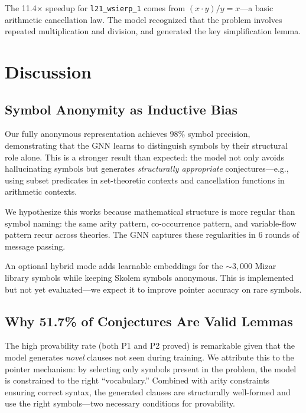 \documentclass{article}
\begin{document}
The 11.4$\times$ speedup for \texttt{l21\_wsierp\_1} comes from
$(x \cdot y) / y = x$---a basic arithmetic cancellation law. The model
recognized that the problem involves repeated multiplication and division,
and generated the key simplification lemma.

\section{Discussion}
\label{sec:discussion}

\subsection{Symbol Anonymity as Inductive Bias}

Our fully anonymous representation achieves 98\% symbol precision, demonstrating
that the GNN learns to distinguish symbols by their structural role alone. This
is a stronger result than expected: the model not only avoids hallucinating
symbols but generates \emph{structurally appropriate} conjectures---e.g., using
subset predicates in set-theoretic contexts and cancellation functions in
arithmetic contexts.

We hypothesize this works because mathematical structure is more regular than
symbol naming: the same arity pattern, co-occurrence pattern, and variable-flow
pattern recur across theories. The GNN captures these regularities in 6 rounds
of message passing.

An optional hybrid mode adds learnable embeddings for the ${\sim}3{,}000$ Mizar
library symbols while keeping Skolem symbols anonymous. This is implemented but
not yet evaluated---we expect it to improve pointer accuracy on rare symbols.

\subsection{Why 51.7\% of Conjectures Are Valid Lemmas}

The high provability rate (both P1 and P2 proved) is remarkable given that the
model generates \emph{novel} clauses not seen during training. We attribute this
to the pointer mechanism: by selecting only symbols present in the problem, the
model is constrained to the right ``vocabulary.'' Combined with arity constraints
ensuring correct syntax, the generated clauses are structurally well-formed and
use the right symbols---two necessary conditions for provability.
\end{document}

